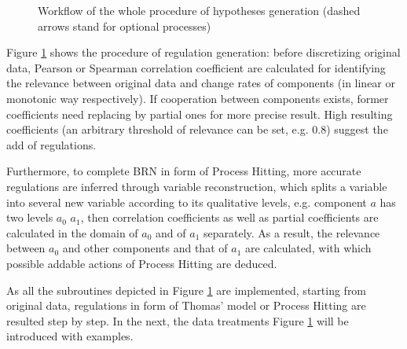 \begin{figure}[ht]
\centering
{}
\caption{Workflow of the whole procedure of hypotheses generation (dashed arrows stand for optional processes)}\label{plan}
\end{figure}
Figure \ref{plan} shows the procedure of regulation generation: before discretizing original data, Pearson or Spearman correlation coefficient \cite{samaga2009logic,hauke2011comparison} are calculated for identifying the relevance between original data and change rates of components (in linear or monotonic way respectively). If cooperation between components exists, former coefficients need replacing by partial ones \cite{de2004discovery} for more precise result. High resulting coefficients (an arbitrary threshold of relevance can be set, e.g.  0.8) suggest the add of regulations.\par
Furthermore, to complete BRN in form of Process Hitting, more accurate regulations are inferred through variable reconstruction, which splits a variable into several new variable according to its qualitative levels, e.g. component $a$ has two levels $a_0$ $a_1$, then correlation coefficients as well as partial coefficients are calculated in the domain of $a_0$ and of $a_1$ separately. As a result, the relevance between $a_0$ and other components and that of $a_1$ are calculated, with which possible addable actions of Process Hitting are deduced.\par
As all the subroutines depicted in Figure \ref{plan} are implemented, starting from original data, regulations in form of Thomas' model or Process Hitting are resulted step by step. In the next, the data treatments Figure \ref{plan} will be introduced with examples.

